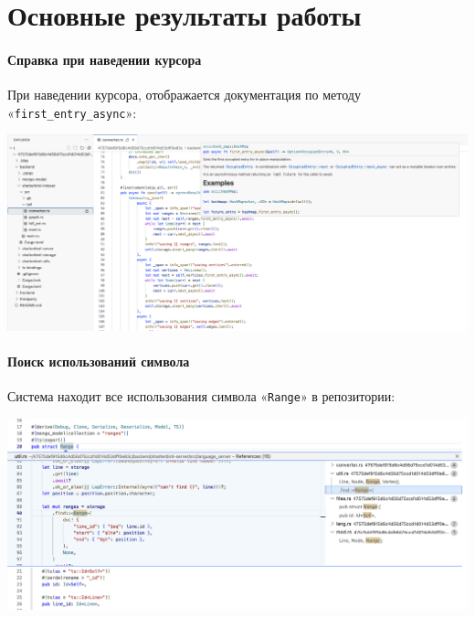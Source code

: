 \documentclass[aspectratio=169,professionalfonts,10pt]{beamer}
\begin{document}
\section{Основные результаты работы}
\begin{frame}[t]{\insertsection}
\framesubtitle{Справка при наведении курсора}

При наведении курсора, отображается документация по методу «\texttt{first\_entry\_async}»:

\includegraphics[width=\linewidth,keepaspectratio]{figures/demo-hover.png}

\end{frame}

\begin{frame}[t]{\insertsection}
\framesubtitle{Поиск использований символа}

Система находит все использования символа «\texttt{Range}» в репозитории:

\includegraphics[width=\linewidth,keepaspectratio]{figures/demo-references.png}

\end{frame}
\end{document}
